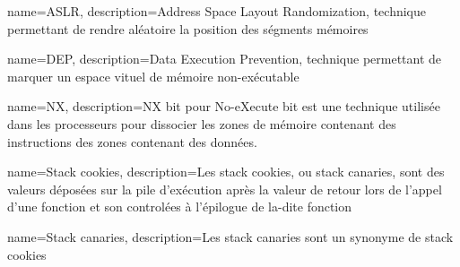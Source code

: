 


{
	name=ASLR,
	description={Address Space Layout Randomization, technique permettant de rendre aléatoire la position des ségments mémoires}
}

{
	name=DEP,
	description={Data Execution Prevention, technique permettant de marquer un espace vituel de mémoire non-exécutable}
}

{
	name=NX,
	description={NX bit pour No-eXecute bit est une technique utilisée dans les processeurs pour dissocier les zones de mémoire contenant des instructions des zones contenant des données.}
}

{
	name={Stack cookies},
	description={Les stack cookies, ou stack canaries, sont des valeurs déposées sur la pile d'exécution après la valeur de retour lors de l'appel d'une fonction et son controlées à l'épilogue de la-dite fonction}
}

{
	name={Stack canaries},
	description={Les stack canaries sont un synonyme de stack cookies}
}





